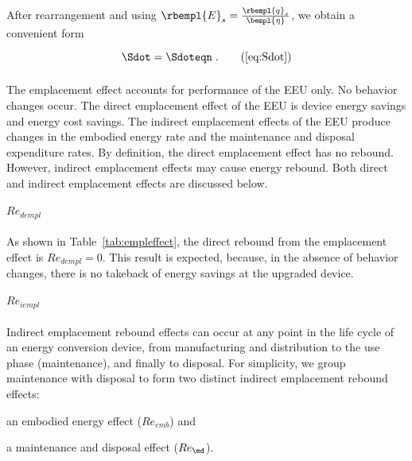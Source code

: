 After rearrangement and using $\rbempl{E}_s = \frac{\rbempl{q}_s}{\bempl{\eta}}$, 
we obtain a convenient form

\begin{equation}
  \Sdot = \Sdoteqn \; .  \tag{\ref{eq:Sdot}}
\end{equation}


\subsubsection{\Empleffect{}}
\label{sec:Re_emp}

The emplacement effect accounts for performance of the EEU only.
No behavior changes occur.
The direct emplacement effect of the EEU is device energy savings and energy cost savings.
The indirect emplacement effects of the EEU produce changes in the embodied energy rate and
the maintenance and disposal expenditure rates.
By definition, the direct emplacement effect has no rebound. 
However, indirect emplacement effects may cause energy rebound.
Both direct and indirect emplacement effects are discussed below.


\paragraph{$Re_{dempl}$}
\label{sec:Re_dempl}

As shown in Table~\ref{tab:empleffect},
the direct rebound from the emplacement effect is
$Re_{dempl} = 0$.
This result is expected, 
because, in the absence of behavior changes,
there is no takeback of energy savings
at the upgraded device.


\paragraph{$Re_{iempl}$} 
\label{sec:Re_iempl}

Indirect emplacement rebound effects 
can occur at any point in the life cycle of an energy conversion device,
from manufacturing and distribution 
to the use phase (maintenance),
and finally to disposal.
For simplicity, we group maintenance with disposal to form
two distinct indirect emplacement rebound effects:
%
\begin{enumerate*}[label={(\alph*)}]
	
  \item an embodied energy effect ($Re_{emb}$) and 
  
  \item a maintenance and disposal effect ($Re_{\md}$).
    
\end{enumerate*}


